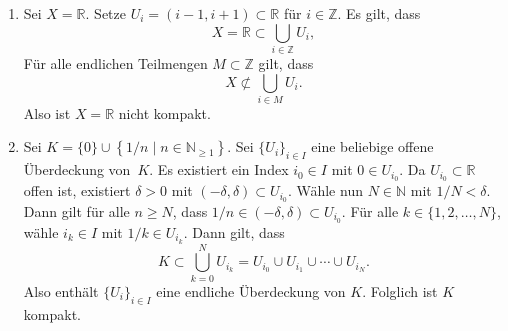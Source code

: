\documentclass[../main.tex]{subfiles}
\begin{document}
\newpage
\begin{examples}
  \leavevmode
  \begin{enumerate}[(1)]
    \item Sei $X = \mathbb{R}$.
      Setze
      $U_i = (i - 1, i + 1) \subset \mathbb{R}$
      für $i \in \mathbb{Z}$.
      Es gilt, dass
      \[
        X = \mathbb{R} \subset \bigcup_{i \in \mathbb{Z}} U_i,
      \]
      Für alle endlichen Teilmengen
      $M \subset \mathbb{Z}$ gilt, dass
      \[
      X \not\subset \bigcup_{i \in M} U_i.
      \]
      Also ist $X = \mathbb{R}$ nicht kompakt.
    \item Sei $K = \{0\} \cup \left\{1/n \mid 
      n \in \mathbb{N}_{\geq 1}\right\}$.
      Sei ${\{U_i\}}_{i \in I}$ eine
      beliebige offene Überdeckung von~$K$.
      Es existiert ein Index $i_0 \in I$ 
      mit $0 \in U_{i_{0}}$. 
      Da $U_{i_0} \subset \mathbb{R}$ offen ist,
      existiert $\delta > 0$ mit
      $(-\delta, \delta) \subset U_{i_0}$.
      Wähle nun $N \in \mathbb{N}$ 
      mit $1/N < \delta$.
      Dann gilt für alle $n \geq N$,
      dass $1/n \in (-\delta, \delta) \subset U_{i_0}$.
      Für alle $k \in \{1, 2, \dots, N\}$, wähle
      $i_k \in I$ mit $1/k \in U_{i_k}$.
      Dann gilt, dass
      \[
        K \subset \bigcup_{k=0}^{N} U_{i_k}
        = U_{i_0} \cup U_{i_1} \cup \cdots
        \cup U_{i_N}.
      \]
      Also enthält ${\{U_i\}}_{i \in I}$ 
      eine endliche Überdeckung von $K$.
      Folglich ist $K$ kompakt.
  \end{enumerate}
\end{examples}
\end{document}
